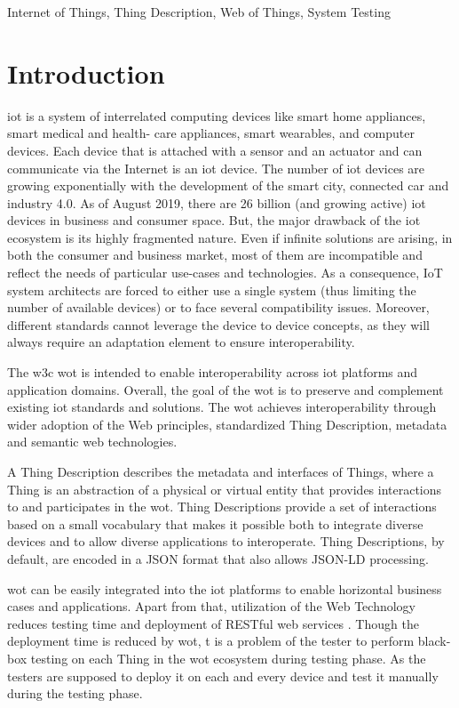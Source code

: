 \documentclass[conference]{IEEEtran}
\theoremstyle{definition}
\begin{document}
\begin{IEEEkeywords}
Internet of Things, Thing Description, Web of Things, System Testing
\end{IEEEkeywords}

\section{Introduction} \label{introduction}

\ac{iot} is a system of interrelated computing devices like smart home appliances, smart medical and health- care appliances, smart wearables, and computer devices. 
Each device that is attached with a sensor and an actuator and can communicate via the Internet is an \ac{iot} device. 
The number of \ac{iot} devices are growing exponentially with the development of the smart city, connected car and industry 4.0. As of August 2019, there are 26 billion (and growing active) \ac{iot} devices in business and consumer space. 
But, the major drawback of the \ac{iot} ecosystem is its highly fragmented nature. 
Even if infinite solutions are arising, in both the consumer and business market, most of them are incompatible and reflect the needs of particular use-cases and technologies.
As a consequence, IoT system architects are forced to either use a single system (thus limiting the number of available devices) or to face several compatibility issues. 
Moreover, different standards cannot leverage the device to device concepts, as they will always require an adaptation element to ensure interoperability. \cite{fantacci2014short}

The \ac{w3c} \ac{wot} is intended to enable interoperability across \ac{iot} platforms and application domains. 
Overall, the goal of the \ac{wot} is to preserve and complement existing \ac{iot} standards and solutions. 
The \ac{wot} achieves interoperability through wider adoption of the Web principles, standardized Thing Description, metadata and semantic web technologies. 

A Thing Description describes the metadata and interfaces of Things, where a Thing is an abstraction of a physical or virtual entity that provides interactions to and participates in the \ac{wot}. 
Thing Descriptions provide a set of interactions based on a small vocabulary that makes it possible both to integrate diverse devices and to allow diverse applications to interoperate. 
Thing Descriptions, by default, are encoded in a JSON format that also allows JSON-LD processing. 

\ac{wot} can be easily integrated into the \ac{iot} platforms to enable horizontal business cases and applications. 
Apart from that, utilization of the Web Technology reduces testing time and deployment of RESTful web services \cite{datta2018advances}.
Though the deployment time is reduced by \ac{wot}, t is a problem of the tester to perform black-box testing on each Thing in the \ac{wot} ecosystem during testing phase. 
As the testers are supposed to deploy it on each and every device and test it manually during the testing phase. 
\end{document}
